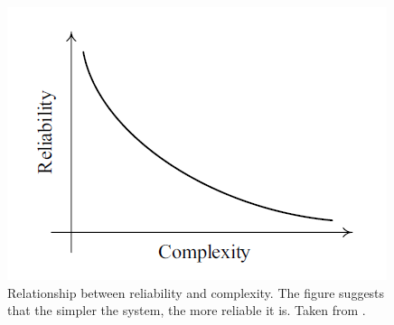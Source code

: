 \begin{figure}[H]
    \centering
    \includegraphics{figs/relability_vs_complexity.png}
    \caption[Relationship between reliability and complexity]{Relationship between reliability and complexity. The figure suggests that the simpler the system, the more reliable it is. Taken from \cite{Jung2000}.}
    \label{fig:relvscomp}
\end{figure}

